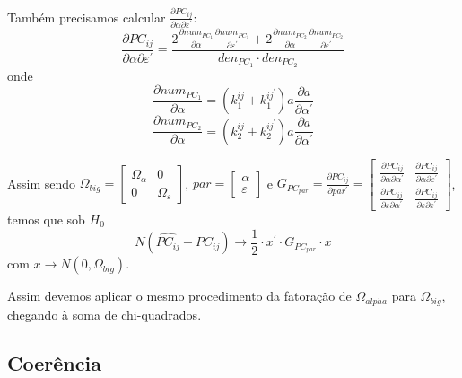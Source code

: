 \documentclass[a4paper,10pt]{article}
\begin{document}
Também precisamos calcular $\frac{\partial PC_{ij}}{\partial \alpha \partial \varepsilon^{'}}$:
\begin{equation}
\frac{\partial PC_{ij}}{\partial \alpha \partial \varepsilon^{'}} = \frac{2 \frac{\partial num_{PC_{1}}}{\partial \alpha} \frac{\partial num_{PC_{1}}}{\partial \varepsilon^{'}} + 2 \frac{\partial num_{PC_{2}}}{\partial \alpha} \frac{\partial num_{PC_{2}}}{\partial \varepsilon^{'}}}{den_{PC_{1}} \cdot den_{PC_{2}}}
\end{equation}
onde
\begin{equation}
\frac{\partial num_{PC_{1}}}{\partial \alpha} = (k_{1}^{ij} + k_{1}^{ij^{'}}) a \frac{\partial a}{\partial \alpha^{'}}
\end{equation}
\begin{equation}
\frac{\partial num_{PC_{2}}}{\partial \alpha} = (k_{2}^{ij} + k_{2}^{ij^{'}}) a \frac{\partial a}{\partial \alpha^{'}}
\end{equation}

Assim sendo $\Omega_{big} = \left[ \begin{array}{cc} 
 \Omega_{\alpha} & 0 \\ 0 & \Omega_{\varepsilon}
\end{array} \right]$, $par = \left[ \begin{array}{c} 
 \alpha \\ \varepsilon
\end{array} \right]$ e $G_{PC_{par}} = \frac{\partial PC_{ij}}{\partial par^{'}} = \left[ \begin{array}{cc} 
\frac{\partial PC_{ij}}{\partial \alpha \partial \alpha^{'}} & 
\frac{\partial PC_{ij}}{\partial \alpha \partial \varepsilon^{'}} \\ 
\frac{\partial PC_{ij}}{\partial \varepsilon \partial \alpha^{'}} & 
\frac{\partial PC_{ij}}{\partial \varepsilon \partial \varepsilon^{'}}
\end{array} \right]$, temos que sob $H_0$
\begin{equation}
N (\hat{PC_{ij}} - PC_{ij}) \to \frac{1}{2} \cdot x^{'} \cdot G_{PC_{par}} \cdot x
\end{equation}
com $x \to N(0, \Omega_{big})$.

Assim devemos aplicar o mesmo procedimento da fatoração de $\Omega_{alpha}$ para $\Omega_{big}$, chegando à soma de chi-quadrados.

\subsection{Coerência}
\end{document}
